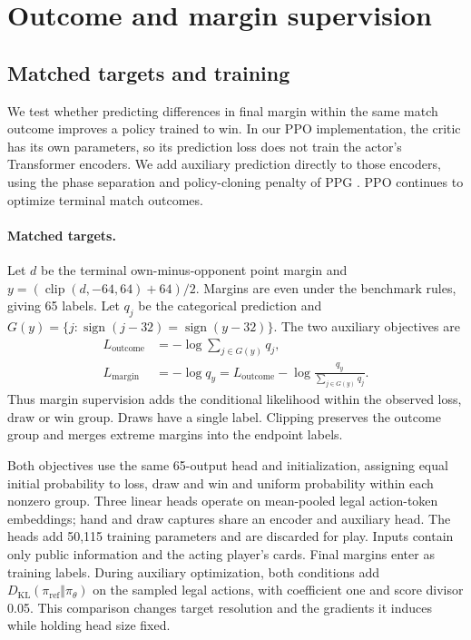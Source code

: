\section{Outcome and margin supervision}
\label{app:score-auxiliary}

\subsection{Matched targets and training}
We test whether predicting differences in final margin within the same match
outcome improves a policy trained to win. In our PPO implementation, the critic
has its own parameters, so its prediction loss does not train the actor's
Transformer encoders. We add auxiliary prediction directly to those encoders,
using the phase separation and policy-cloning penalty of PPG
\cite{cobbe2021phasic}. PPO continues to optimize terminal match outcomes.

\paragraph{Matched targets.}
Let $d$ be the terminal own-minus-opponent point margin and
$y=(\operatorname{clip}(d,-64,64)+64)/2$. Margins are even under the benchmark
rules, giving 65 labels. Let $q_j$ be the categorical prediction and
$G(y)=\{j:\operatorname{sign}(j-32)=\operatorname{sign}(y-32)\}$.
The two auxiliary objectives are
\begin{align}
 L_{\mathrm{outcome}}&=-\log\sum_{j\in G(y)}q_j,\\
 L_{\mathrm{margin}}&=-\log q_y
 =L_{\mathrm{outcome}}
  -\log\frac{q_y}{\sum_{j\in G(y)}q_j}.
\end{align}
Thus margin supervision adds the conditional likelihood within the observed
loss, draw or win group. Draws have a single label. Clipping preserves the
outcome group and merges extreme margins into the endpoint labels.

Both objectives use the same 65-output head and initialization, assigning equal
initial probability to loss, draw and win and uniform probability within each
nonzero group. Three linear heads operate on mean-pooled legal action-token
embeddings; hand and draw captures share an encoder and auxiliary head. The
heads add 50,115 training parameters and are discarded for play. Inputs contain
only public information and the acting player's cards. Final margins enter as
training labels. During auxiliary optimization, both conditions add
$D_{\mathrm{KL}}(\pi_{\mathrm{ref}}\Vert\pi_\theta)$ on the sampled legal actions,
with coefficient one and score divisor 0.05. This comparison changes target
resolution and the gradients it induces while holding head size fixed.

